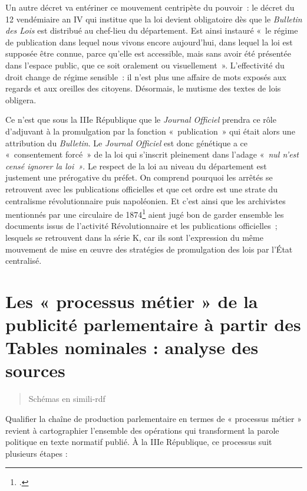 Un autre décret va entériner ce mouvement centripète du pouvoir : le décret du 12 vendémiaire an IV qui institue que la loi devient obligatoire dès que le \emph{Bulletin des Lois} est distribué au chef-lieu du département. Est ainsi instauré « le  régime de publication dans lequel nous vivons encore aujourd’hui, dans  lequel la loi est supposée être connue, parce qu’elle est accessible,  mais sans avoir été présentée dans l’espace public, que ce soit oralement ou visuellement ». L’effectivité du droit change de régime sensible : il n’est plus une affaire de mots exposés aux regards  et aux oreilles des citoyens. Désormais, le mutisme des textes de lois obligera.

Ce n’est que sous la IIIe République que le \emph{Journal Officiel} prendra ce rôle d’adjuvant à la promulgation par la fonction « publication » qui était alors une attribution du \emph{Bulletin}. Le \emph{Journal Officiel} est donc génétique a ce « consentement forcé » de la loi qui s’inscrit pleinement dans l’adage « \emph{nul n’est censé ignorer la loi »}. Le respect de la loi au niveau du département est justement une prérogative du préfet. On comprend pourquoi  les arrêtés se retrouvent avec les publications officielles et que cet ordre est une strate du centralisme révolutionnaire puis napoléonien. Et c’est ainsi que les archivistes mentionnés par une circulaire de 1874\footcite[][]{circulaire} aient jugé bon de garder ensemble les documents issus de l’activité Révolutionnaire et les publications officielles ; lesquels se retrouvent dans la série K, car ils sont l’expression du même mouvement de mise en œuvre des stratégies de promulgation des lois par l’État centralisé.

\section{Les « processus métier » de la publicité parlementaire à partir des Tables nominales : analyse des sources}

\begin{quote}
Schémas en simili-rdf 

\end{quote}
Qualifier la chaîne de production parlementaire en termes de « processus métier » revient à cartographier l’ensemble des opérations qui transforment la parole politique en texte normatif publié. À la IIIe République, ce processus suit plusieurs étapes :

